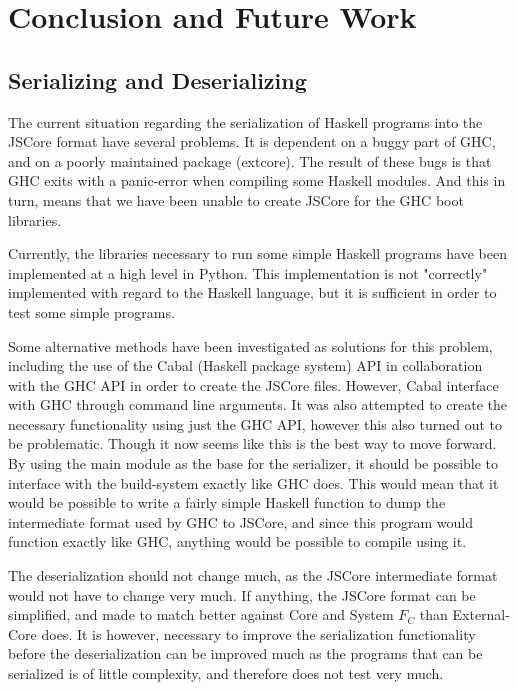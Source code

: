 
\chapter{Conclusion and Future Work}
\label{chap:conc}


\section{Serializing and Deserializing}

The current situation regarding the serialization of Haskell programs into 
the JSCore format have several problems. It is dependent on a buggy part of GHC, 
and on a poorly maintained package (extcore). The result of these bugs is that
GHC exits with a panic-error when compiling some Haskell modules. And this in
turn, means that we have been unable to create JSCore for the GHC boot libraries.

Currently, the libraries necessary to run some simple Haskell programs have been
implemented at a high level in Python. This implementation is not "correctly"
implemented with regard to the Haskell language, but it is sufficient in order
to test some simple programs.

Some alternative methods have been investigated as solutions for this problem,
including the use of the Cabal (Haskell package system) API in collaboration
with the GHC API in order to create the JSCore files. However, Cabal interface
with GHC through command line arguments. 
It was also attempted to create the necessary functionality using just the GHC
API, however this also turned out to be problematic. Though it now seems like
this is the best way to move forward. By using the main module as the base for
the serializer, it should be possible to interface with the build-system
exactly like GHC does. This would mean that it would be possible to write a
fairly simple Haskell function to dump the intermediate format used by GHC
to JSCore, and since this program would function exactly like GHC, anything 
would be possible to compile using it.

The deserialization should not change much, as the JSCore intermediate format
would not have to change very much. If anything, the JSCore format can be
simplified, and made to match better against Core and System $F_C$ than
External-Core does. It is however, necessary to improve the serialization
functionality before the deserialization can be improved much as the programs
that can be serialized is of little complexity, and therefore does not test
very much.




